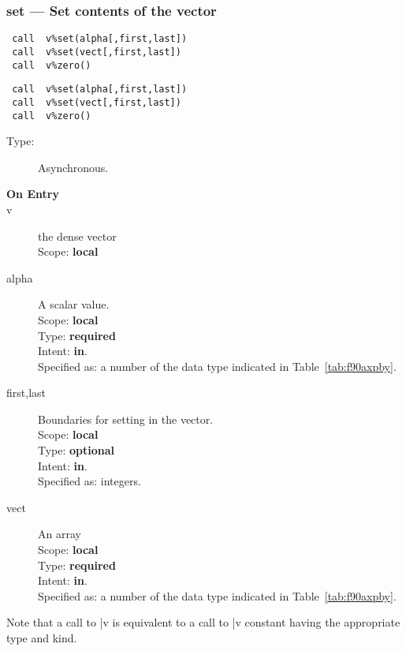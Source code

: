 \subsubsection{set  --- Set contents of the vector}

\ifpdf
\begin{verbatim}
 call  v%set(alpha[,first,last])
 call  v%set(vect[,first,last])
 call  v%zero()
\end{verbatim}
\else
\begin{verbatim}
 call  v%set(alpha[,first,last])
 call  v%set(vect[,first,last])
 call  v%zero()
\end{verbatim}
\fi

\begin{description}
\item[Type:] Asynchronous.
\item[\bf On Entry]
\item[v] the dense vector\\
Scope: {\bf local}\\
\item[alpha] A scalar value. \\ Scope: {\bf local} \\ Type: {\bf
required} \\ Intent: {\bf in}.\\ Specified as: a number of the data
type indicated in Table~\ref{tab:f90axpby}.

\item[first,last] Boundaries for setting in the vector.\\ Scope: {\bf
    local} \\ Type: {\bf optional} \\ Intent: {\bf in}.\\ Specified
  as: integers.
\item[vect] An  array \\ Scope: {\bf local} \\ Type: {\bf
required} \\ Intent: {\bf in}.\\ Specified as: a number of the data
type indicated in Table~\ref{tab:f90axpby}.
\end{description}
Note that a call to \fortinline|v%
is equivalent to a call to \fortinline|v%
constant having the appropriate type and kind.


